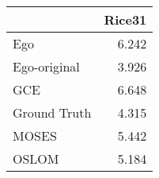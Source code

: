 \begin{tabular}{lr}
\toprule
{} & Rice31 \\
\midrule
Ego          &  6.242 \\
Ego-original &  3.926 \\
GCE          &  6.648 \\
Ground Truth &  4.315 \\
MOSES        &  5.442 \\
OSLOM        &  5.184 \\
\bottomrule
\end{tabular}

